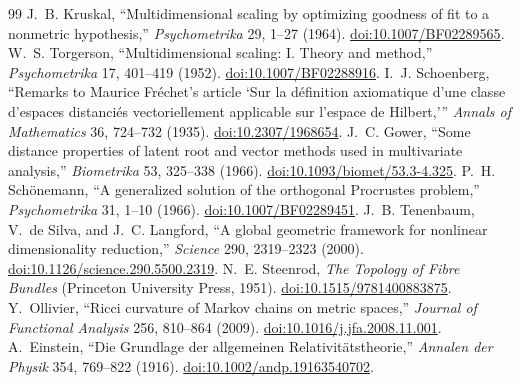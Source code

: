 \documentclass[11pt]{article}
\newcommand{\doi}[1]{\href{https://doi.org/#1}{doi:#1}}
\begin{document}
\begin{thebibliography}{99}
 J.~B. Kruskal, “Multidimensional scaling by optimizing
goodness of fit to a nonmetric hypothesis,” \emph{Psychometrika} 29, 1--27
(1964). \doi{10.1007/BF02289565}.
 W.~S. Torgerson, “Multidimensional scaling: I. Theory
and method,” \emph{Psychometrika} 17, 401--419 (1952).
\doi{10.1007/BF02288916}.
 I.~J. Schoenberg, “Remarks to Maurice Fr\'echet's
article `Sur la d\'efinition axiomatique d'une classe d'espaces distanci\'es
vectoriellement applicable sur l'espace de Hilbert,'” \emph{Annals of
Mathematics} 36, 724--732 (1935). \doi{10.2307/1968654}.
 J.~C. Gower, “Some distance properties of latent root and
vector methods used in multivariate analysis,” \emph{Biometrika} 53, 325--338
(1966). \doi{10.1093/biomet/53.3-4.325}.
 P.~H. Sch\"onemann, “A generalized solution of the
orthogonal Procrustes problem,” \emph{Psychometrika} 31, 1--10 (1966).
\doi{10.1007/BF02289451}.
 J.~B. Tenenbaum, V.~de Silva, and J.~C. Langford,
“A global geometric framework for nonlinear dimensionality reduction,”
\emph{Science} 290, 2319--2323 (2000).
\doi{10.1126/science.290.5500.2319}.
 N.~E. Steenrod, \emph{The Topology of Fibre Bundles}
(Princeton University Press, 1951). \doi{10.1515/9781400883875}.
 Y.~Ollivier, “Ricci curvature of Markov chains on metric
spaces,” \emph{Journal of Functional Analysis} 256, 810--864 (2009).
\doi{10.1016/j.jfa.2008.11.001}.
 A.~Einstein, “Die Grundlage der allgemeinen
Relativit\"atstheorie,” \emph{Annalen der Physik} 354, 769--822 (1916).
\doi{10.1002/andp.19163540702}.
\end{thebibliography}
\end{document}
